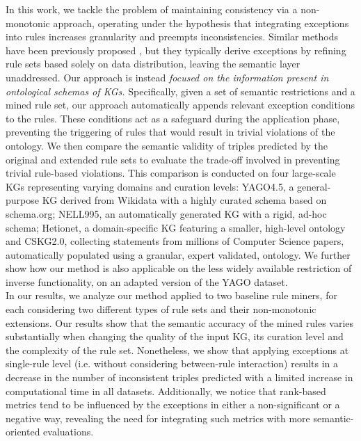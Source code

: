 \documentclass[a4paper,UKenglish,cleveref, autoref, thm-restate]{tgdk-v2021}
\begin{document}
\indent In this work, we tackle the problem of maintaining consistency via a non-monotonic approach, operating under the hypothesis that integrating exceptions into rules increases granularity and preempts inconsistencies. Similar methods have been previously proposed \cite{gad-elrab_exception-enriched_2016,lisi_combining_2017,tran_towards_2017}, but they typically derive exceptions by refining rule sets based solely on data distribution, leaving the semantic layer unaddressed. Our approach is instead \textit{focused on the information present in ontological schemas of KGs.} Specifically, given a set of semantic restrictions and a mined rule set, our approach automatically appends relevant exception conditions to the rules. These conditions act as a safeguard during the application phase, preventing the triggering of rules that would result in trivial violations of the ontology. We then compare the semantic validity of triples predicted by the original and extended rule sets to evaluate the trade-off involved in preventing trivial rule-based violations. This comparison is conducted on four large-scale KGs representing varying domains and curation levels: YAGO4.5, a general-purpose KG derived from Wikidata with a highly curated schema based on schema.org; NELL995, an automatically generated KG with a rigid, ad-hoc schema; Hetionet, a domain-specific KG featuring a smaller, high-level ontology and CSKG2.0, collecting statements from millions of Computer Science papers, automatically populated using a granular, expert validated, ontology. We further show how our method is also applicable on the less widely available restriction of inverse functionality, on an adapted version of the YAGO dataset.\\
\indent In our results, we analyze our method applied to two baseline rule miners, for each considering two different types of rule sets and their non-monotonic extensions. Our results show that the semantic accuracy of the mined rules varies substantially when changing the quality of the input KG, its curation level and the complexity of the rule set. Nonetheless, we show that applying exceptions at single-rule level (i.e. without considering between-rule interaction)  results in a decrease in the number of inconsistent triples predicted with a limited increase in computational time in all datasets.
Additionally, we notice that rank-based metrics tend to be influenced by the exceptions in either a non-significant or a negative way, revealing the need for integrating such metrics with more semantic-oriented evaluations.
\end{document}
